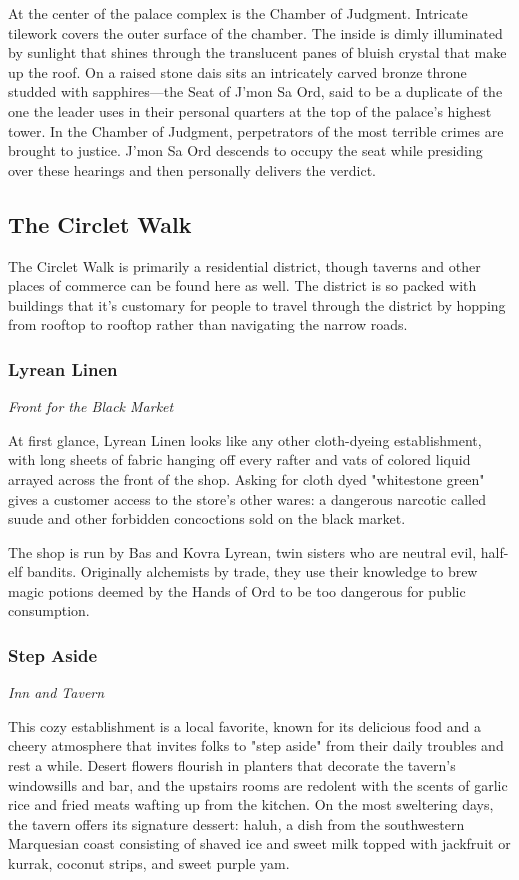 \documentclass[10pt,a4paper,twoside,bg=print,twocolumn,openany,nodeprecatedcode]{dndbook}
\begin{document}
At the center of the palace complex is the Chamber of Judgment. Intricate tilework covers the outer surface of the chamber. The inside is dimly illuminated by sunlight that shines through the translucent panes of bluish crystal that make up the roof. On a raised stone dais sits an intricately carved bronze throne studded with sapphires—the Seat of J'mon Sa Ord, said to be a duplicate of the one the leader uses in their personal quarters at the top of the palace's highest tower. In the Chamber of Judgment, perpetrators of the most terrible crimes are brought to justice. J'mon Sa Ord descends to occupy the seat while presiding over these hearings and then personally delivers the verdict.

\subsection{The Circlet Walk}
The Circlet Walk is primarily a residential district, though taverns and other places of commerce can be found here as well. The district is so packed with buildings that it's customary for people to travel through the district by hopping from rooftop to rooftop rather than navigating the narrow roads.

\subsubsection{Lyrean Linen}
\textit{Front for the Black Market}

At first glance, Lyrean Linen looks like any other cloth-dyeing establishment, with long sheets of fabric hanging off every rafter and vats of colored liquid arrayed across the front of the shop. Asking for cloth dyed "whitestone green" gives a customer access to the store's other wares: a dangerous narcotic called suude and other forbidden concoctions sold on the black market.

The shop is run by Bas and Kovra Lyrean, twin sisters who are neutral evil, half-elf bandits. Originally alchemists by trade, they use their knowledge to brew magic potions deemed by the Hands of Ord to be too dangerous for public consumption.

\subsubsection{Step Aside}
\textit{Inn and Tavern}

This cozy establishment is a local favorite, known for its delicious food and a cheery atmosphere that invites folks to "step aside" from their daily troubles and rest a while. Desert flowers flourish in planters that decorate the tavern's windowsills and bar, and the upstairs rooms are redolent with the scents of garlic rice and fried meats wafting up from the kitchen. On the most sweltering days, the tavern offers its signature dessert: haluh, a dish from the southwestern Marquesian coast consisting of shaved ice and sweet milk topped with jackfruit or kurrak, coconut strips, and sweet purple yam.
\end{document}

